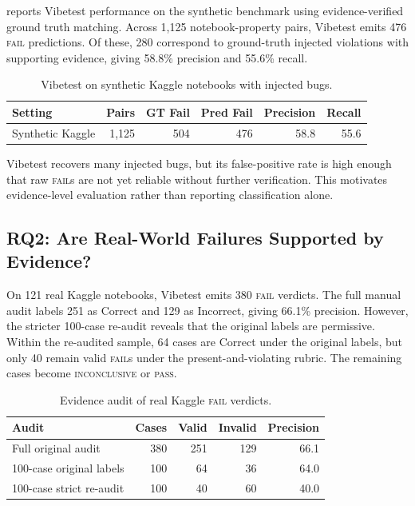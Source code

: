 \documentclass[11pt]{article}
\begin{document}
 reports Vibetest performance on the synthetic benchmark using evidence-verified ground truth matching.
Across 1,125 notebook-property pairs, Vibetest emits 476 \textsc{fail} predictions.
Of these, 280 correspond to ground-truth injected violations with supporting evidence, giving 58.8\% precision and 55.6\% recall.

\begin{table}[t]
  \centering
  \small
  \caption{Vibetest on synthetic Kaggle notebooks with injected bugs.}
  \label{tab:synthetic-results}
  \begin{tabular}{lrrrrr}
    \toprule
    Setting & Pairs & GT Fail & Pred Fail & Precision & Recall \\
    \midrule
    Synthetic Kaggle & 1,125 & 504 & 476 & 58.8 & 55.6 \\
    \bottomrule
  \end{tabular}
\end{table}

Vibetest recovers many injected bugs, but its false-positive rate is high enough that raw \textsc{fail}s are not yet reliable without further verification.
This motivates evidence-level evaluation rather than reporting classification alone.

\subsection{RQ2: Are Real-World Failures Supported by Evidence?}

On 121 real Kaggle notebooks, Vibetest emits 380 \textsc{fail} verdicts.
The full manual audit labels 251 as Correct and 129 as Incorrect, giving 66.1\% precision.
However, the stricter 100-case re-audit reveals that the original labels are permissive.
Within the re-audited sample, 64 cases are Correct under the original labels, but only 40 remain valid \textsc{fail}s under the present-and-violating rubric.
The remaining cases become \textsc{inconclusive} or \textsc{pass}.

\begin{table}[t]
  \centering
  \small
  \caption{Evidence audit of real Kaggle \textsc{fail} verdicts.}
  \label{tab:real-audit}
  \begin{tabular}{lrrrr}
    \toprule
    Audit & Cases & Valid & Invalid & Precision \\
    \midrule
    Full original audit & 380 & 251 & 129 & 66.1 \\
    100-case original labels & 100 & 64 & 36 & 64.0 \\
    100-case strict re-audit & 100 & 40 & 60 & 40.0 \\
    \bottomrule
  \end{tabular}
\end{table}
\end{document}
